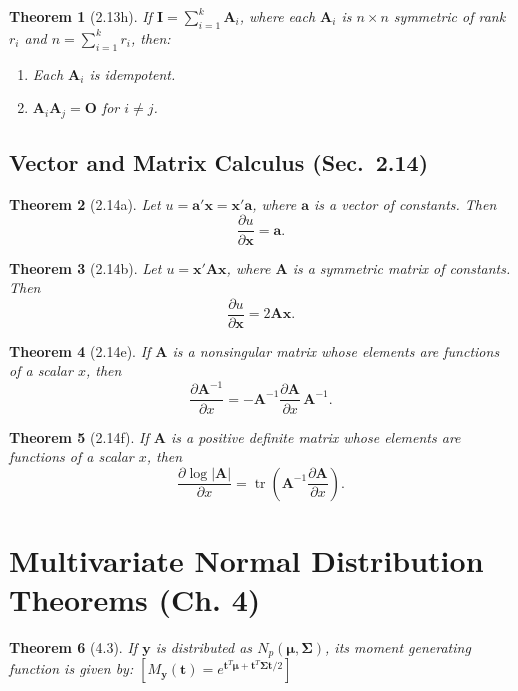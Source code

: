 \documentclass{article}
\newtheorem{theorem}{Theorem}[section]
\begin{document}
\begin{theorem}[2.13h]
If $\mathbf{I} = \sum_{i=1}^{k} \mathbf{A}_i$, where each $\mathbf{A}_i$ is $n \times n$ symmetric of rank $r_i$ and $n = \sum_{i=1}^{k} r_i$, then:
\begin{enumerate}[label=(\roman*)]
\item Each $\mathbf{A}_i$ is idempotent.
\item $\mathbf{A}_i\mathbf{A}_j = \mathbf{O}$ for $i \neq j$.
\end{enumerate}
\end{theorem}

\subsection{Vector and Matrix Calculus (Sec.\ 2.14)}

\begin{theorem}[2.14a]
Let $u = \mathbf{a}'\mathbf{x} = \mathbf{x}'\mathbf{a}$, where $\mathbf{a}$ is a vector of constants. Then
\[
\frac{\partial u}{\partial \mathbf{x}} = \mathbf{a}.
\]
\end{theorem}

\begin{theorem}[2.14b]
Let $u = \mathbf{x}'\mathbf{A}\mathbf{x}$, where $\mathbf{A}$ is a symmetric matrix of constants. Then
\[
\frac{\partial u}{\partial \mathbf{x}} = 2\mathbf{A}\mathbf{x}.
\]
\end{theorem}

\begin{theorem}[2.14e]
If $\mathbf{A}$ is a nonsingular matrix whose elements are functions of a scalar $x$, then
\[
\frac{\partial \mathbf{A}^{-1}}{\partial x} = -\mathbf{A}^{-1} \frac{\partial \mathbf{A}}{\partial x}\, \mathbf{A}^{-1}.
\]
\end{theorem}

\begin{theorem}[2.14f]
If $\mathbf{A}$ is a positive definite matrix whose elements are functions of a scalar $x$, then
\[
\frac{\partial \log|\mathbf{A}|}{\partial x} = \operatorname{tr}\!\left(\mathbf{A}^{-1} \frac{\partial \mathbf{A}}{\partial x}\right).
\]
\end{theorem}

\section{Multivariate Normal Distribution Theorems (Ch. 4)}

\begin{theorem}[4.3]
If $\mathbf{y}$ is distributed as $N_p(\boldsymbol{\mu}, \boldsymbol{\Sigma})$, its moment generating function is given by:
$[M_{\mathbf{y}}(\mathbf{t}) = e^{\mathbf{t}^T\boldsymbol{\mu} + \mathbf{t}^T\boldsymbol{\Sigma}\mathbf{t}/2}]$
\end{theorem}
\end{document}
